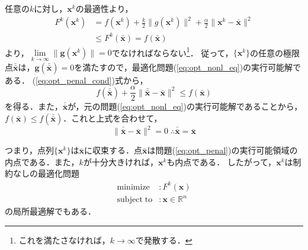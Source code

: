 \documentclass{jsreport}
\begin{document}
任意の$k$に対し，$\bm{x}^k$の最適性より，
\begin{align}\label{eq:opt_penal_cond}
  F^k(\bm{x}^k) &= f(\bm{x}^k) + \frac{k}{2}\|g(\bm{x}^k)\|^2 + \frac{\alpha}{2}\|\bm{x}^k - \bar{\bm{x}}\|^2 \nonumber \\
  &\leq F^k(\bar{\bm{x}}) = f(\bar{\bm{x}})
\end{align}
より，$\lim \limits_{k \rightarrow \infty} \|\bm{g}(\bm{x}^k)\| = 0$でなければならない\footnote{これを満たさなければ，$k \rightarrow \infty$で発散する．}．
従って，$\{\bm{x}^k\}$の任意の極限点$\bar{\bar{\bm{x}}}$は，$\bm{g}(\bar{\bar{\bm{x}}}) = 0$を満たすので，最適化問題(\ref{eq:opt_nonl_eq})の実行可能解である．
(\ref{eq:opt_penal_cond})式から，
\begin{equation}
  f(\bar{\bar{\bm{x}}}) + \frac{\alpha}{2}\|\bar{\bar{\bm{x}}} - \bar{\bm{x}}\|^2 \leq f(\bar{\bm{x}}) \nonumber
\end{equation}
を得る．また，$\bar{\bar{\bm{x}}}$が，元の問題(\ref{eq:opt_nonl_eq})の実行可能解であることから，
$f(\bar{\bm{x}}) \leq f(\bar{\bar{\bm{x}}})$．これと上式を合わせて，
\begin{equation}
  \|\bar{\bar{\bm{x}}} - \bar{\bm{x}}\|^2 = 0 \; \therefore \bar{\bar{\bm{x}}} = \bar{\bm{x}} \nonumber
\end{equation}

つまり，点列$\{\bm{x}^k\}$は$\bar{\bm{x}}$に収束する．点$\bar{\bm{x}}$は問題(\ref{eq:opt_penal})の実行可能領域の内点である．また，$k$が十分大きければ，$\bm{x}^k$も内点である．
したがって，$\bm{x}^k$は制約なしの最適化問題
\begin{align}\label{eq:opt_penal_non}
  \mathrm{minimize} &: F^k(\bm{x}) \nonumber\\
  \mathrm{subject \; to} &: \bm{x} \in \mathbb{R}^n
\end{align}
の局所最適解でもある．
\end{document}
